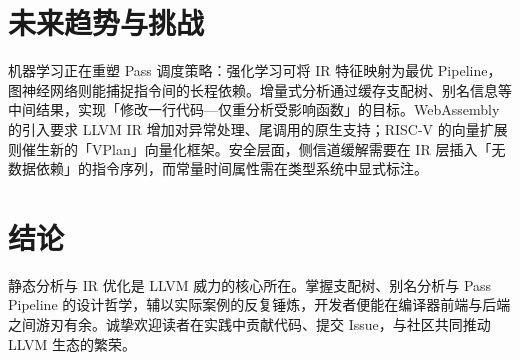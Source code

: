\chapter{未来趋势与挑战}
机器学习正在重塑 Pass 调度策略：强化学习可将 IR 特征映射为最优 Pipeline，图神经网络则能捕捉指令间的长程依赖。增量式分析通过缓存支配树、别名信息等中间结果，实现「修改一行代码—仅重分析受影响函数」的目标。WebAssembly 的引入要求 LLVM IR 增加对异常处理、尾调用的原生支持；RISC-V 的向量扩展则催生新的「VPlan」向量化框架。安全层面，侧信道缓解需要在 IR 层插入「无数据依赖」的指令序列，而常量时间属性需在类型系统中显式标注。\par
\chapter{结论}
静态分析与 IR 优化是 LLVM 威力的核心所在。掌握支配树、别名分析与 Pass Pipeline 的设计哲学，辅以实际案例的反复锤炼，开发者便能在编译器前端与后端之间游刃有余。诚挚欢迎读者在实践中贡献代码、提交 Issue，与社区共同推动 LLVM 生态的繁荣。\par
